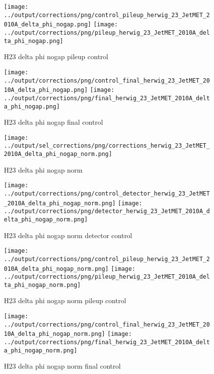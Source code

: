 \documentclass[11pt]{book}
\begin{document}
\begin{figure}[ht]
\centering
\texttt{[image: ../output/corrections/png/control\_pileup\_herwig\_23\_JetMET\_2010A\_delta\_phi\_nogap.png]}
\texttt{[image: ../output/corrections/png/pileup\_herwig\_23\_JetMET\_2010A\_delta\_phi\_nogap.png]}
\caption{H23 delta phi nogap pileup control}
\label{fig:H23_JetMET_2010A_delta_phi_nogap_pileup_control}
\end{figure}


\begin{figure}[ht]
\centering
\texttt{[image: ../output/corrections/png/control\_final\_herwig\_23\_JetMET\_2010A\_delta\_phi\_nogap.png]}
\texttt{[image: ../output/corrections/png/final\_herwig\_23\_JetMET\_2010A\_delta\_phi\_nogap.png]}
\caption{H23 delta phi nogap final control}
\label{fig:H23_JetMET_2010A_delta_phi_nogap_final_control}
\end{figure}


\begin{figure}[ht]
\centering
\texttt{[image: ../output/sel\_corrections/png/corrections\_herwig\_23\_JetMET\_2010A\_delta\_phi\_nogap\_norm.png]}
\caption{H23 delta phi nogap norm}
\label{fig:H23_JetMET_2010A_delta_phi_nogap_norm}
\end{figure}

\begin{figure}[ht]
\centering
\texttt{[image: ../output/corrections/png/control\_detector\_herwig\_23\_JetMET\_2010A\_delta\_phi\_nogap\_norm.png]}
\texttt{[image: ../output/corrections/png/detector\_herwig\_23\_JetMET\_2010A\_delta\_phi\_nogap\_norm.png]}
\caption{H23 delta phi nogap norm detector control}
\label{fig:H23_JetMET_2010A_delta_phi_nogap_norm_detector_control}
\end{figure}

\begin{figure}[ht]
\centering
\texttt{[image: ../output/corrections/png/control\_pileup\_herwig\_23\_JetMET\_2010A\_delta\_phi\_nogap\_norm.png]}
\texttt{[image: ../output/corrections/png/pileup\_herwig\_23\_JetMET\_2010A\_delta\_phi\_nogap\_norm.png]}
\caption{H23 delta phi nogap norm pileup control}
\label{fig:H23_JetMET_2010A_delta_phi_nogap_norm_pileup_control}
\end{figure}


\begin{figure}[ht]
\centering
\texttt{[image: ../output/corrections/png/control\_final\_herwig\_23\_JetMET\_2010A\_delta\_phi\_nogap\_norm.png]}
\texttt{[image: ../output/corrections/png/final\_herwig\_23\_JetMET\_2010A\_delta\_phi\_nogap\_norm.png]}
\caption{H23 delta phi nogap norm final control}
\label{fig:H23_JetMET_2010A_delta_phi_nogap_norm_final_control}
\end{figure}
\end{document}
